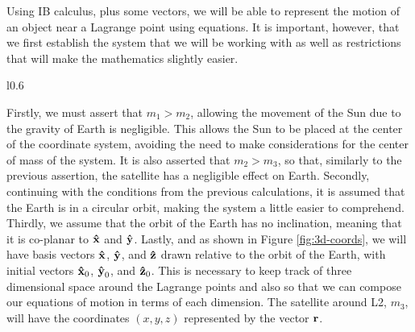 Using IB calculus, plus some vectors, we will be able to represent the motion of an object near a Lagrange point using equations.
It is important, however, that we first establish the system that we will be working with as well as restrictions that will make the mathematics slightly easier.
\begin{wrapfigure}{l}{0.6\textwidth}
	\centering
	\vspace*{0.25cm}
	\caption{three-dimensional diagram of the Sun-Earth system with basis vectors relative to the Earth's orbit. Positions are exaggerated and not to scale.}
	\label{fig:3d-coords}
\end{wrapfigure}
Firstly, we must assert that $m_1 > m_2$, allowing the movement of the Sun due to the gravity of Earth is negligible.
This allows the Sun to be placed at the center of the coordinate system, avoiding the need to make considerations for the center of mass of the system.
It is also asserted that $m_2 > m_3$, so that, similarly to the previous assertion, the satellite has a negligible effect on Earth.
Secondly, continuing with the conditions from the previous calculations, it is assumed that the Earth is in a circular orbit, making the system a little easier to comprehend.
Thirdly, we assume that the orbit of the Earth has no inclination, meaning that it is co-planar to $\uvec{x}$ and $\uvec{y}$.
Lastly, and as shown in Figure \ref{fig:3d-coords}, we will have basis vectors $\uvec{x}$, $\uvec{y}$, and $\uvec{z}$ drawn relative to the orbit of the Earth, with initial vectors $\uvec{x}_0$, $\uvec{y}_0$, and $\uvec{z}_0$.
This is necessary to keep track of three dimensional space around the Lagrange points and also so that we can compose our equations of motion in terms of each dimension.
The satellite around L2, $m_3$, will have the coordinates $(x,y,z)$ represented by the vector $\bm{\mathbf{r}}$.

